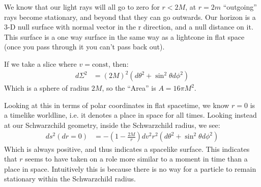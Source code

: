 We know that our light rays will all go to zero for $r<2M$, at $r=2m$ ``outgoing'' rays become stationary, and beyond that they can go outwards.
Our horizon is a 3-D null surface with normal vector in the r direction, and a null distance on it. This surface is a one way surface in the same way as a lightcone in flat space (once you pass through it you can't pass back out).

If we take a slice where $v=\text{const}$, then:
\begin{align*}
	d\Sigma^2 &= (2M)^2(d\theta^2 + \sin^2\theta d\phi^2)
\end{align*}
Which is a sphere of radius $2M$, so the ``Area'' is $A=16\pi M^2$.

Looking at this in terms of polar coordinates in flat spacetime, we know $r=0$ is a timelike worldline, i.e. it denotes a place in space for all times.
Looking instead at our Schwarzchild geometry, inside the Schwarzchild radius, we see:
\begin{align*}
	ds^2 (dr=0) &= -\left(1 - \frac{2M}{r}\right) dv^2 r^2 (d\theta^2 + \sin^2\theta d\phi^2)
\end{align*}
Which is always positive, and thus indicates a spacelike surface. This indicates that $r$ seems to have taken on a role more similar to a moment in time than a place in space.
Intuitively this is because there is no way for a particle to remain stationary within the Schwarzchild radius.

